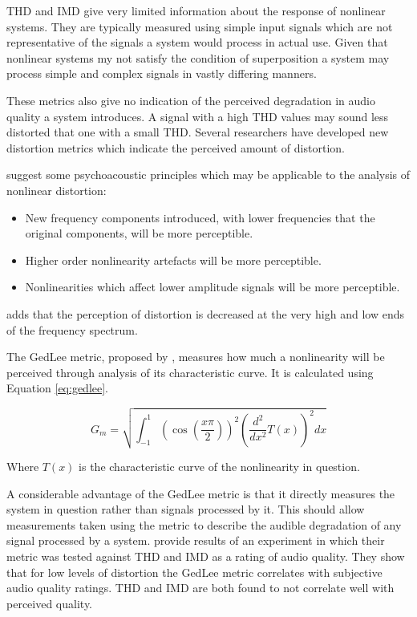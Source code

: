 		THD and IMD give very limited information about the response of nonlinear systems. They are typically
		measured using simple input signals which are not representative of the signals a system would process in
		actual use. Given that nonlinear systems my not satisfy the condition of superposition a system may process
		simple and complex signals in vastly differing manners. 

		These metrics also give no indication of the perceived degradation in audio quality a system introduces. A
		signal with a high THD values may sound less distorted that one with a small THD. Several researchers have
		developed new distortion metrics which indicate the perceived amount of distortion.

		\citet{geddes2003auditory} suggest some psychoacoustic principles which may be applicable to the analysis of
		nonlinear distortion:

		\begin{itemize}
			\item New frequency components introduced, with lower frequencies that the original components, will
			      be more perceptible.
			\item Higher order nonlinearity artefacts will be more perceptible.
			\item Nonlinearities which affect lower amplitude signals will be more perceptible.
		\end{itemize}

		\citet{voishvillo2006assessment} adds that the perception of distortion is decreased at the very high and
		low ends of the frequency spectrum.

		The GedLee metric, proposed by \citet{geddes2003auditory}, measures how much a nonlinearity will be
		perceived through analysis of its characteristic curve. It is calculated using Equation \ref{eq:gedlee}.

		\begin{equation}
			G_{m} = \sqrt{\int_{-1}^{1} \left( \cos \left( \frac{x\pi}{2} \right) \right)^{2}
				      \left( \frac{d^{2}}{dx^{2}} T(x) \right)^{2} dx}
			\label{eq:gedlee}
		\end{equation}

		Where $T(x)$ is the characteristic curve of the nonlinearity in question.

		A considerable advantage of the GedLee metric is that it directly measures the system in question rather
		than signals processed by it. This should allow measurements taken using the metric to describe the audible
		degradation of any signal processed by a system. \citet{lee2003auditory} provide results of an experiment
		in which their metric was tested against THD and IMD as a rating of audio quality. They show that for low
		levels of distortion the GedLee metric correlates with subjective audio quality ratings. THD and IMD are
		both found to not correlate well with perceived quality.

